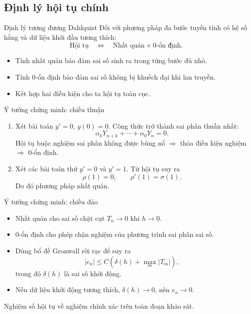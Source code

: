 \documentclass[aspectratio=43]{beamer}
\begin{document}
\subsection*{Định lý hội tụ chính}
\begin{frame}
\begin{baitapbox}{Định lý tương đương Dahlquist}
Đối với phương pháp đa bước tuyến tính có hệ số hằng và dữ liệu khởi đầu tương thích:
\[
 \boxed{\text{Hội tụ}\quad \Longleftrightarrow\quad \text{Nhất quán} + \text{0-ổn định}.}
\]
\end{baitapbox}
\begin{itemize}
  \item Tính nhất quán bảo đảm sai số sinh ra trong từng bước đủ nhỏ.
  \item Tính 0-ổn định bảo đảm sai số không bị khuếch đại khi lan truyền.
  \item Kết hợp hai điều kiện cho ta hội tụ toàn cục.
\end{itemize}
\end{frame}

\begin{frame}{Ý tưởng chứng minh: chiều thuận}
\begin{enumerate}
  \item Xét bài toán $y'=0$, $y(0)=0$. Công thức trở thành sai phân thuần nhất:
  \[
    \alpha_kY_{n+k}+\cdots+\alpha_0Y_n=0.
  \]
  Hội tụ buộc nghiệm sai phân không được bùng nổ $\Rightarrow$ thỏa điều kiện nghiệm $\Rightarrow$ 0-ổn định.
  \item Xét các bài toán thử $y'=0$ và $y'=1$. Từ hội tụ suy ra
  \[
    \rho(1)=0,
    \qquad
    \rho'(1)=\sigma(1).
  \]
  Do đó phương pháp nhất quán.
\end{enumerate}
\end{frame}

\begin{frame}{Ý tưởng chứng minh: chiều đảo}
\begin{itemize}
  \item Nhất quán cho sai số chặt cụt $T_n\to0$ khi $h\to0$.
  \item 0-ổn định cho phép chặn nghiệm của phương trình sai phân sai số.
  \item Dùng bổ đề Gronwall rời rạc để suy ra
  \[
    |e_n|\le C\left(\delta(h)+\max_m |T_m|\right),
  \]
  trong đó $\delta(h)$ là sai số khởi động.
  \item Nếu dữ liệu khởi động tương thích, $\delta(h)\to0$, nên $e_n\to0$.
\end{itemize}
\begin{tcolorbox}[title={Kết luận}, colback=softgreen, colframe=tealgreen, colbacktitle=tealgreen]
Nghiệm số hội tụ về nghiệm chính xác trên toàn đoạn khảo sát.
\end{tcolorbox}
\end{frame}
\end{document}
